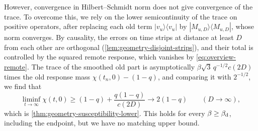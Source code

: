 However, convergence in Hilbert--Schmidt norm does not give convergence of the trace. To overcome this, we rely on the lower semicontinuity of the trace on positive operators, after replacing each old term $|v_u\rangle\langle v_u|$ by $|M_{u,D}\rangle\langle M_{u,D}|$, whose norm converges. By causality, the errors on time strips at distance at least $D$ from each other are orthogonal (\cref{lem:geometry-disjoint-strips}), and their total is controlled by the squared remote response, which vanishes by \eqref{eq:overview-remote}. The trace of the smoothed old part is asymptotically $\beta\sqrt3\,q^{-1/2}c(2D)$ times the old response mass $\chi(t_n,0)-(1-q)$, and comparing it with $2^{-1/2}$, we find that
\[
 \liminf_{t\to\infty}\chi(t,0)\ge(1-q)+\frac{q(1-q)}{c(2D)}\longrightarrow2(1-q)\qquad(D\to\infty),
\]
which is \cref{thm:geometry-susceptibility-lower}. This holds for every $\beta\ge\beta_{\mathrm d}$, including the endpoint, but we have no matching upper bound.

